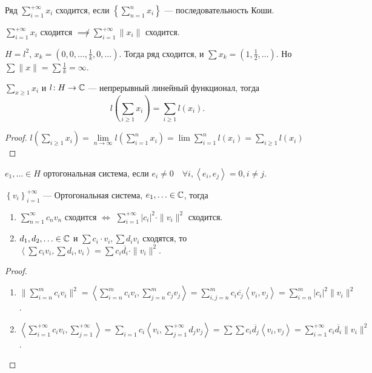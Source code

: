 \begin{definition}
   Ряд $\sum\limits_{i = 1}^{+\infty} x_i$ сходится, если $\left\{ \sum\limits_{n=1}^{n} x_i \right\} $ --- последовательность Коши. 
\end{definition}
\begin{remark}
    $\sum\limits_{i=1}^{+\infty} x_i$ сходится $\not \implies \sum\limits_{i= 1}^{+\infty} \|x_i\|$ сходится.
\end{remark}
\begin{example}
    $H = l^2$,  $x_k = (0, 0, \ldots, \frac{1}{k}, 0, \ldots)$. Тогда ряд сходится, и $\sum x_k = (1, \frac{1}{2}, \ldots)$. Но $\sum \|x\| = \sum \frac{1}{k} = \infty$.
\end{example}
\begin{lemma}
    $\sum\limits_{x \ge  1} x_i$ и $l\!: H \to \mathbb{C}$ --- непрерывный линейный функционал, тогда  \[
    l(\sum\limits_{i \ge  1} x_i) = \sum\limits_{i \ge 1} l(x_i)
    .\] 
\end{lemma}
\begin{proof}
    $l\left( \sum\limits_{i \ge  1} x_i \right) = \lim\limits_{n \to \infty} l(\sum\limits_{i = 1}^n x_i) = \lim \sum\limits_{i=1}^n l(x_i) = \sum\limits_{i \ge  1} l(x_i)$
\end{proof}
\begin{definition}
    $e_1, \ldots \in H$ ортогональная система, если $e_i \neq 0 \quad \forall i, \left< e_i, e_j \right> = 0, i \neq j$.
\end{definition}
\begin{lemma}
    $\left\{ v_i \right\}_{i = 1}^{+\infty}$ --- Ортогональная система, $e_1, \ldots \in \mathbb{C}$, тогда 
    \begin{enumerate}
        \item $\sum_{n=1}^{\infty} c_n v_n$ сходится $\iff$ $\sum\limits_{i = 1}^{+\infty} |c_i|^2 \cdot \|v_i\|^2$ сходится.
        \item $d_1, d_2, \ldots \in \mathbb{C}$ и $\sum c_i \cdot  v_i, \sum d_i v_i$ сходятся, то $\left< \sum c_i v_i, \sum d_i, v_i \right> = \sum c_i \overline{d_i} \cdot  \|v_i\|^2$.
    \end{enumerate}
\end{lemma}
\begin{proof}
    \begin{enumerate}
        \item $\|\sum\limits_{i = n}^m c_i v_i\|^2 = \left<\sum\limits_{i = n}^m c_iv_i, \sum\limits_{j = n}^m c_j v_j \right> = \sum\limits_{i, j = n}^{m} c_i \overline{c_j} \left< v_i, v_j \right> = \sum\limits_{i = n}^m  |c_i|^2 \|v_i\|^2$. 
        \item $\left< \sum\limits_{i = 1}^{+\infty} c_i v_i, \sum\limits_{j = 1}^{+\infty} \right> = \sum\limits_{i = 1} c_i \left<v_i, \sum\limits_{j=1}^{+\infty} d_jv_j \right> = \sum \sum c_i \overline{d_j} \left< v_i, v_j \right> = \sum\limits_{i = 1}^{+\infty} c_i \overline{d_i} \|v_i\|^2$.
    \end{enumerate}
\end{proof}

